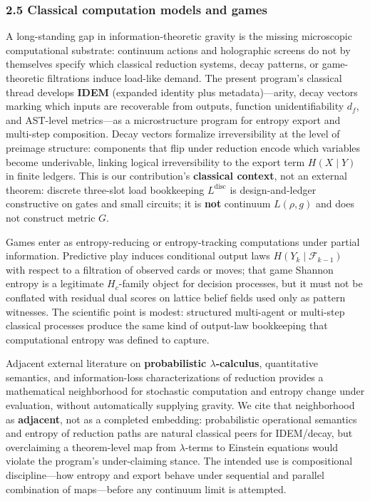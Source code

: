 \documentclass[
  11pt,
]{article}
\begin{document}
\subsubsection{2.5 Classical computation models and
games}\label{classical-computation-models-and-games}

A long-standing gap in information-theoretic gravity is the missing
microscopic computational substrate: continuum actions and holographic
screens do not by themselves specify which classical reduction systems,
decay patterns, or game-theoretic filtrations induce load-like demand.
The present program's classical thread develops \textbf{IDEM} (expanded
identity plus metadata)---arity, decay vectors marking which inputs are
recoverable from outputs, function unidentifiability \(d_f\), and
AST-level metrics---as a microstructure program for entropy export and
multi-step composition. Decay vectors formalize irreversibility at the
level of preimage structure: components that flip under reduction encode
which variables become underivable, linking logical irreversibility to
the export term \(H(X\mid Y)\) in finite ledgers. This is our
contribution's \textbf{classical context}, not an external theorem:
discrete three-slot load bookkeeping \(L^{\mathrm{disc}}\) is
design-and-ledger constructive on gates and small circuits; it is
\textbf{not} continuum \(L(\rho,g)\) and does not construct metric
\(G\).

Games enter as entropy-reducing or entropy-tracking computations under
partial information. Predictive play induces conditional output laws
\(H(Y_k\mid\mathcal{F}_{k-1})\) with respect to a filtration of observed
cards or moves; that game Shannon entropy is a legitimate \(H_c\)-family
object for decision processes, but it must not be conflated with
residual dual scores on lattice belief fields used only as pattern
witnesses. The scientific point is modest: structured multi-agent or
multi-step classical processes produce the same kind of output-law
bookkeeping that computational entropy was defined to capture.

Adjacent external literature on \textbf{probabilistic
\(\lambda\)-calculus}, quantitative semantics, and information-loss
characterizations of reduction provides a mathematical neighborhood for
stochastic computation and entropy change under evaluation, without
automatically supplying gravity. We cite that neighborhood as
\textbf{adjacent}, not as a completed embedding: probabilistic
operational semantics and entropy of reduction paths are natural
classical peers for IDEM/decay, but overclaiming a theorem-level map
from \(\lambda\)-terms to Einstein equations would violate the program's
under-claiming stance. The intended use is compositional
discipline---how entropy and export behave under sequential and parallel
combination of maps---before any continuum limit is attempted.
\end{document}
